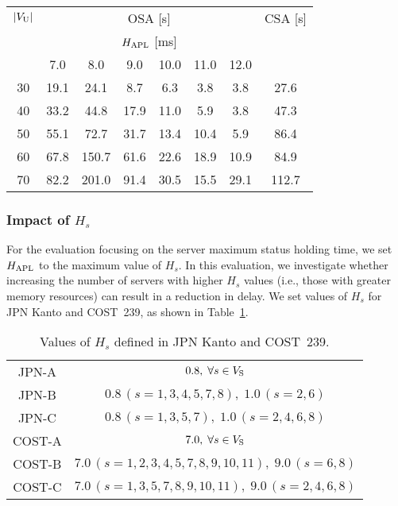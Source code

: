\documentclass[10pt, letterpaper]{IEEEtran}
\begin{document}
\begin{CJK}{UTF8}{ipxm}
\begin{table}[t]
  \begin{center}
    \begin{tabular}{c|cccccc|c}
      \hline
      $|V_{\rm{U}}|$ & \multicolumn{6}{c|}{OSA [s]} & CSA [s] \\ \cline{2-7}
       & \multicolumn{6}{c|}{$H_{\rm{APL}}$ [ms]} & \\
       & 7.0 & 8.0 & 9.0 & 10.0 & 11.0 & 12.0 &  \\
      \hline
      30 & 19.1 &  24.1 &  8.7 &  6.3 &  3.8 &  3.8 &  27.6 \\
      40 & 33.2 &  44.8 & 17.9 & 11.0 &  5.9 &  3.8 &  47.3 \\
      50 & 55.1 &  72.7 & 31.7 & 13.4 & 10.4 &  5.9 &  86.4 \\
      60 & 67.8 & 150.7 & 61.6 & 22.6 & 18.9 & 10.9 &  84.9 \\
      70 & 82.2 & 201.0 & 91.4 & 30.5 & 15.5 & 29.1 & 112.7 \\
      \hline
    \end{tabular}
  \end{center}
\end{table}

\subsubsection{Impact of $H_s$}
For the evaluation focusing on the server maximum status holding time, we set $H_{\rm APL}$ to the maximum value of $H_s$.
In this evaluation, we investigate whether increasing the number of servers with higher $H_s$ values (i.e., those with greater memory resources) can result in a reduction in delay.
We set values of $H_s$ for JPN Kanto and COST~239, as shown in Table~\ref{tab:condition_hs_JPN_COST}.
\begin{table}[t]
  \caption{Values of $H_s$ defined in JPN Kanto and COST~239.}
  \label{tab:condition_hs_JPN_COST}
  \begin{center}
    \begin{tabular}{c|c}
      \hline
      JPN-A & $0.8,\; \forall s \in V_{\rm S}$ \\
      JPN-B & $0.8\,(s=1,3,4,5,7,8),\;1.0\,(s=2,6)$ \\
      JPN-C & $0.8\,(s=1,3,5,7),\;1.0\,(s=2,4,6,8)$ \\
      \hline
      COST-A & $7.0,\; \forall s \in V_{\rm S}$ \\
      COST-B & $7.0\,(s=1,2,3,4,5,7,8,9,10,11),\;9.0\,(s=6,8)$ \\
      COST-C & $7.0\,(s=1,3,5,7,8,9,10,11),\;9.0\,(s=2,4,6,8)$ \\
      \hline
    \end{tabular}
  \end{center}
\end{table}


\end{CJK}
\end{document}
